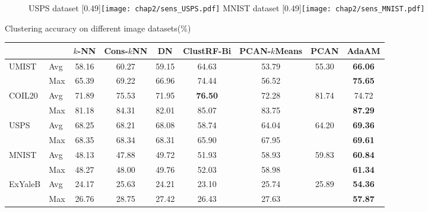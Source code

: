 \begin{figure}[t]
	\centering
					{USPS dataset}
					[0.49\textwidth]{\texttt{[image: chap2/sens\_USPS.pdf]}}
					{MNIST dataset}
					[0.49\textwidth]{\texttt{[image: chap2/sens\_MNIST.pdf]}}
	\label{fig2:Sen2}
\end{figure} 
\begin{table}[t]
	{Clustering accuracy on different image datasets(\%)}
	\label{tab2:Acc}
	\small
	\centering
		\begin{tabular}{llccccccc}
			\toprule
			& &$k$-NN\cite{niyogi2004locality} &Cons-$k$NN\cite{premachandran2013consensus} &DN\cite{pavan2007dominant} &ClustRF-Bi\cite{zhu2014constructing} &PCAN-$k$Means\cite{nie2014clustering} &PCAN\cite{nie2014clustering}& AdaAM
			\\
			\midrule
			\multirow{2}{*}{UMIST} & Avg & 58.16& 60.27& 59.15& 64.63& 53.79& \multirow{2}{*}{55.30}   & \textbf{66.06}\\
			& Max& 65.39& 69.22& 66.96& 74.44& 56.52&& \textbf{75.65}\\
			\midrule
			\multirow{2}{*}{COIL20} & Avg & 71.89& 75.53& 71.95& \textbf{76.50}& 72.28& \multirow{2}{*}{81.74}& 74.72\\
			& Max& 81.18& 84.31& 82.01& 85.07& 83.75&& \textbf{87.29}\\
			\midrule
			\multirow{2}{*}{USPS}  & Avg & 68.25& 68.21& 68.08& 58.74& 64.04& \multirow{2}{*}{64.20}  & \textbf{69.36}\\
			& Max& 68.35& 68.34& 68.31& 65.90& 67.95&& \textbf{69.61}\\
			\midrule
			\multirow{2}{*}{MNIST} & Avg & 48.13& 47.88& 49.72& 51.93& 58.93& \multirow{2}{*}{59.83}  & \textbf{60.84}\\
			& Max& 48.27& 48.00& 49.76& 52.03& 58.98&& \textbf{61.34}\\
			\midrule
			\multirow{2}{*}{ExYaleB} & Avg& 24.17& 25.63& 24.21& 23.10& 25.74& \multirow{2}{*}{25.89} & \textbf{54.36}\\
			& Max& 26.76& 28.75& 27.42& 26.43& 27.63&& \textbf{57.87}\\
			\bottomrule
		\end{tabular}
\end{table}

